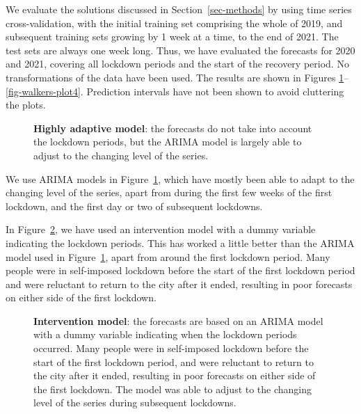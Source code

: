 \documentclass[
  11pt,
  a4paper,
]{article}
\begin{document}
We evaluate the solutions discussed in Section~\ref{sec-methods} by
using time series cross-validation, with the initial training set
comprising the whole of 2019, and subsequent training sets growing by 1
week at a time, to the end of 2021. The test sets are always one week
long. Thus, we have evaluated the forecasts for 2020 and 2021, covering
all lockdown periods and the start of the recovery period. No
transformations of the data have been used. The results are shown in
Figures \ref{fig-walkers-plot1}--\ref{fig-walkers-plot4}. Prediction
intervals have not been shown to avoid cluttering the plots.

\begin{figure}


\caption{\label{fig-walkers-plot1}\textbf{Highly adaptive model}: the
forecasts do not take into account the lockdown periods, but the ARIMA
model is largely able to adjust to the changing level of the series.}

\end{figure}%

We use ARIMA models in Figure~\ref{fig-walkers-plot1}, which have mostly
been able to adapt to the changing level of the series, apart from
during the first few weeks of the first lockdown, and the first day or
two of subsequent lockdowns.

In Figure~\ref{fig-walkers-plot2}, we have used an intervention model
with a dummy variable indicating the lockdown periods. This has worked a
little better than the ARIMA model used in
Figure~\ref{fig-walkers-plot1}, apart from around the first lockdown
period. Many people were in self-imposed lockdown before the start of
the first lockdown period and were reluctant to return to the city after
it ended, resulting in poor forecasts on either side of the first
lockdown.

\begin{figure}


\caption{\label{fig-walkers-plot2}\textbf{Intervention model}: the
forecasts are based on an ARIMA model with a dummy variable indicating
when the lockdown periods occurred. Many people were in self-imposed
lockdown before the start of the first lockdown period, and were
reluctant to return to the city after it ended, resulting in poor
forecasts on either side of the first lockdown. The model was able to
adjust to the changing level of the series during subsequent lockdowns.}

\end{figure}%
\end{document}
